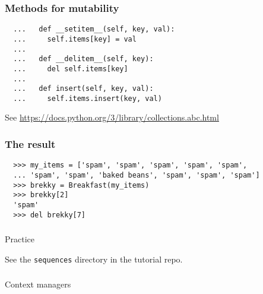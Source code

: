 \documentclass[aspectratio=169]{beamer}
\begin{document}
\begin{frame}[fragile]
  \frametitle{Methods for mutability}
  
  \begin{verbatim}
  ...   def __setitem__(self, key, val):
  ...     self.items[key] = val
  ...
  ...   def __delitem__(self, key):
  ...     del self.items[key]
  ...
  ...   def insert(self, key, val):
  ...     self.items.insert(key, val) 

  \end{verbatim}
  
  \bigbreak
  See \url{https://docs.python.org/3/library/collections.abc.html}
 \end{frame}

\begin{frame}[fragile]
  \frametitle{The result}
  
  \begin{verbatim}
  >>> my_items = ['spam', 'spam', 'spam', 'spam', 'spam',
  ... 'spam', 'spam', 'baked beans', 'spam', 'spam', 'spam']
  >>> brekky = Breakfast(my_items)
  >>> brekky[2]
  'spam'
  >>> del brekky[7]
 \end{verbatim}
  
 \end{frame}


\begin{frame}
  \frametitle{} 
   
   \centerline{\huge Practice} 
   \centerline{See the \texttt{sequences} directory in the tutorial repo.} 
   
   \end{frame}
\begin{frame}
  \frametitle{} 
  \centerline{\huge Context managers}
 \end{frame}
\end{document}
